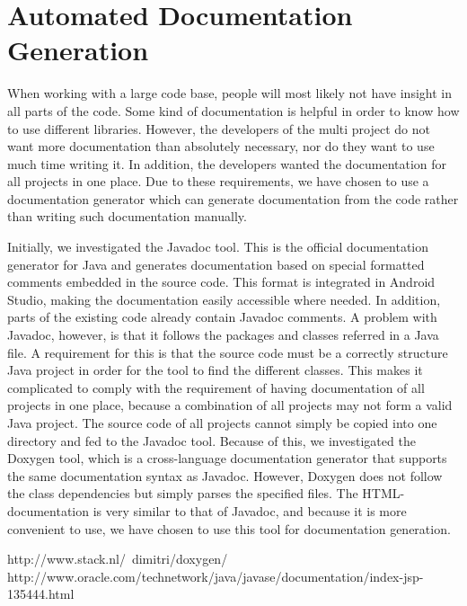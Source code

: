 

\section{Automated Documentation Generation}\label{sec:automated_documentation_gen}
When working with a large code base, people will most likely not have insight in all parts of the code. Some kind of documentation is helpful in order to know how to use different libraries. However, the developers of the multi project do not want more documentation than absolutely necessary, nor do they want to use much time writing it. In addition, the developers wanted the documentation for all projects in one place. Due to these requirements, we have chosen to use a documentation generator which can generate documentation from the code rather than writing such documentation manually.

Initially, we investigated the Javadoc tool. This is the official documentation generator for Java and generates documentation based on special formatted comments embedded in the source code. This format is integrated in Android Studio, making the documentation easily accessible where needed. In addition, parts of the existing code already contain Javadoc comments. A problem with Javadoc, however, is that it follows the packages and classes referred in a Java file. A requirement for this is that the source code must be a correctly structure Java project in order for the tool to find the different classes. This makes it complicated to comply with the requirement of having documentation of all projects in one place, because a combination of all projects may not form a valid Java project. The source code of all projects cannot simply be copied into one directory and fed to the Javadoc tool. Because of this, we investigated the Doxygen tool, which is a cross-language documentation generator that supports the same documentation syntax as Javadoc. However, Doxygen does not follow the class dependencies but simply parses the specified files. The HTML-documentation is very similar to that of Javadoc, and because it is more convenient to use, we have chosen to use this tool for documentation generation.

http://www.stack.nl/~dimitri/doxygen/
http://www.oracle.com/technetwork/java/javase/documentation/index-jsp-135444.html

